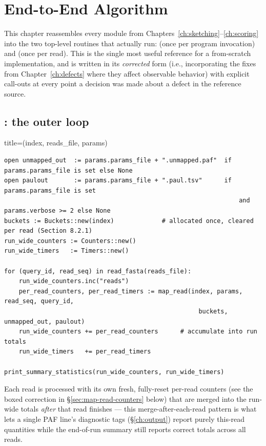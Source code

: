 \chapter{End-to-End Algorithm}
\label{ch:end-to-end}

This chapter reassembles every module from Chapters~\ref{ch:sketching}--\ref{ch:scoring} into the
two top-level routines that actually run:  (once per program invocation) and
 (once per read). This is the single most useful reference for a from-scratch
implementation, and is written in its \emph{corrected} form (i.e., incorporating the fixes from
Chapter~\ref{ch:defects} where they affect observable behavior) with explicit call-outs at every
point a decision was made about a defect in the reference source.

\section{: the outer loop}

\begin{algobox}{title={(index, reads\_file, params)}}
\begin{verbatim}
open unmapped_out  := params.params_file + ".unmapped.paf"  if params.params_file is set else None
open paulout       := params.params_file + ".paul.tsv"      if params.params_file is set
                                                                and params.verbose >= 2 else None
buckets := Buckets::new(index)             # allocated once, cleared per read (Section 8.2.1)
run_wide_counters := Counters::new()
run_wide_timers   := Timers::new()

for (query_id, read_seq) in read_fasta(reads_file):
    run_wide_counters.inc("reads")
    per_read_counters, per_read_timers := map_read(index, params, read_seq, query_id,
                                                     buckets, unmapped_out, paulout)
    run_wide_counters += per_read_counters      # accumulate into run totals
    run_wide_timers   += per_read_timers

print_summary_statistics(run_wide_counters, run_wide_timers)
\end{verbatim}
\end{algobox}

\begin{notebox}
Each read is processed with its own fresh, fully-reset per-read counters (see the boxed
correction in \S\ref{sec:map-read-counters} below) that are merged into the run-wide totals
\emph{after} that read finishes --- this merge-after-each-read pattern is what lets a single PAF
line's diagnostic tags (\S\ref{ch:output}) report purely this-read quantities while the
end-of-run summary still reports correct totals across all reads.
\end{notebox}

